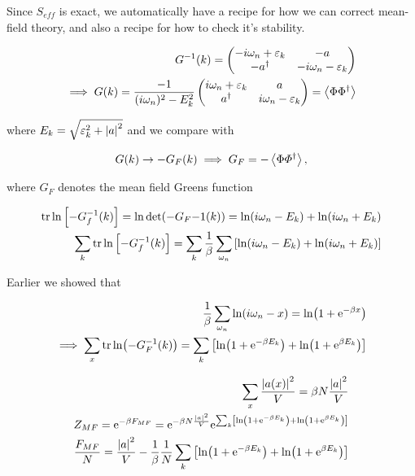 Since $S_{eff}$ is exact, we automatically have a recipe for how we can correct mean-field theory, and also a recipe for how to check it's stability. 

\begin{align*}
    G^{-1}(k) = \begin{pmatrix}-i\omega_n + \varepsilon_k  & -a \\ -a^{\dagger} & -i\omega_n -\varepsilon_k \end{pmatrix} \\ 
    \implies G(k) = \frac{-1}{(i\omega_n)^2 - E_k^{2}} \begin{pmatrix}i\omega_n + \varepsilon_k  & a \\ a^{\dagger} & i\omega_n - \varepsilon_k \end{pmatrix} = \expval{\Phi \Phi^\dagger} 
\end{align*}

where $E_k = \sqrt{\varepsilon_k ^2 + \abs{a}^2}$ and we compare with 

\begin{align*}
    G(k) \to -G_F(k) \implies G_F = - \expval{\Phi \varPhi^\dagger},
\end{align*}

where $G_F$ denotes the mean field Greens function

\begin{align*}
    \tr \ln \left[-G_f ^{-1} (k) \right] = \ln \det(-G_F {-1} (k)) = \ln(i\omega_n - E_k) + \ln(i\omega_n + E_k)\\ 
    \sum_k \tr \ln \left[-G_f ^{-1} (k) \right] = \sum_k \frac{1}{\beta} \sum_{\omega_n} \left[ \ln(i\omega_n - E_k) + \ln(i\omega_n + E_k) \right]
\end{align*}

Earlier we showed that 

\begin{align*}
    \frac{1}{\beta}\sum_{\omega_n} \ln(i\omega_n - x) = \ln(1 + \mathrm{e}^{-\beta x}) \\ 
    \implies \sum_x \tr \ln(-G_F ^{-1}(k)) = \sum_k \left[\ln(1 + \mathrm{e}^{-\beta E_k}) + \ln(1 + \mathrm{e}^{\beta E_k})\right] 
\end{align*}

\begin{align*}
    \sum_x \frac{\abs{a(x)}^2}{V} = \beta N \frac{\abs{a}^2}{V} \\ 
    Z_{MF} = \mathrm{e}^{-\beta F_{MF}} = \mathrm{e}^{-\beta N \frac{\abs{a}^2}{V}} \mathrm{e}^{\sum_k \left[\ln(1 + \mathrm{e}^{-\beta E_k}) + \ln(1 + \mathrm{e}^{\beta E_k})\right]} \\ 
    \frac{F_{MF}}{N} = \frac{\abs{a}^2}{V} - \frac{1}{\beta} \frac{1}{N}\sum_k \left[\ln(1 + \mathrm{e}^{-\beta E_k}) + \ln(1 + \mathrm{e}^{\beta E_k})\right]
\end{align*}

